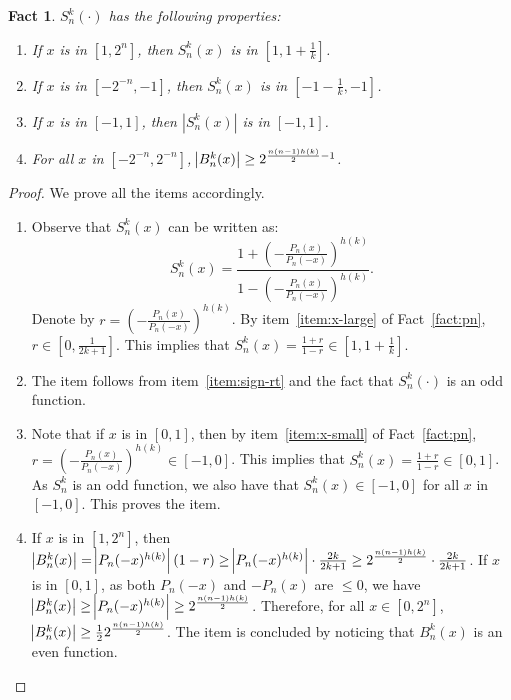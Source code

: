 \documentclass{article}
\newtheorem{fact}[theorem]{Fact}
\begin{document}
\begin{fact}
$S_n^k(\cdot)$ has the following properties:
\begin{enumerate}
\item If $x$ is in $[1, 2^n]$, then $S_n^k(x)$ is in $[1, 1 + \frac 1 k]$. \label{item:sign-rt}
\item If $x$ is in $[-2^{-n}, -1]$, then $S_n^k(x)$ is in $[-1 - \frac 1 k, -1]$. \label{item:sign-lt}
\item If $x$ is in $[-1, 1]$, then $|S_n^k(x)|$ is in $[-1, 1]$. \label{item:sign-mid}
\item For all $x$ in $[-2^{-n}, 2^{-n}]$, $\abs{B_n^k(x)} \geq 2^{\frac{n(n-1)h(k)}2 - 1}$. \label{item:sign-denom}
\end{enumerate}
\label{fact:newman}
\end{fact}
\begin{proof}
We prove all the items accordingly.
\begin{enumerate}
\item Observe that $S_n^k(x)$ can be written as:
\[ S_n^k(x) = \frac{1 + (-\frac{P_n(x)}{P_n(-x)})^{h(k)}}{ 1 - (-\frac{P_n(x)}{P_n(-x)})^{h(k)} }.  \]
Denote by $r = (-\frac{P_n(x)}{P_n(-x)})^{h(k)}$. By item~\ref{item:x-large} of Fact~\ref{fact:pn}, $r \in [0, \frac{1}{2k+1}]$. This implies that
$S_n^k(x) = \frac{1+r}{1-r} \in [1, 1 + \frac 1 k]$.

\item The item follows from item~\ref{item:sign-rt} and the fact that $S_n^k(\cdot)$ is an odd function.

\item Note that if $x$ is in $[0, 1]$, then by item~\ref{item:x-small} of Fact~\ref{fact:pn}, $r = (-\frac{P_n(x)}{P_n(-x)})^{h(k)} \in [-1, 0]$. This implies that $S_n^k(x) = \frac{1+r}{1-r} \in [0,1]$. As $S_n^k$ is an odd function, we also have that $S_n^k(x) \in [-1, 0]$ for all $x$ in $[-1, 0]$. This proves the item.

\item If $x$ is in $[1,2^n]$, then $\abs{B_n^k(x)} = \abs{P_n(-x)^{h(k)}} (1 - r) \geq \abs{P_n(-x)^{h(k)}} \cdot \frac{2k}{2k+1} \geq 2^{\frac{n(n-1)h(k)}{2}} \cdot \frac{2k}{2k+1}$.
If $x$ is in $[0,1]$, as both $P_n(-x)$ and $-P_n(x)$ are $\leq 0$, we have $\abs{B_n^k(x)} \geq \abs{P_n(-x)^{h(k)}} \geq 2^{\frac{n(n-1)h(k)}{2}}$. Therefore, for all $x \in [0,2^n]$,
$\abs{B_n^k(x)} \geq \frac 1 2 2^{\frac{n(n-1)h(k)}2}$. The item is concluded by noticing that $B_n^k(x)$ is an even function.


\end{enumerate}

\end{proof}
\end{document}
